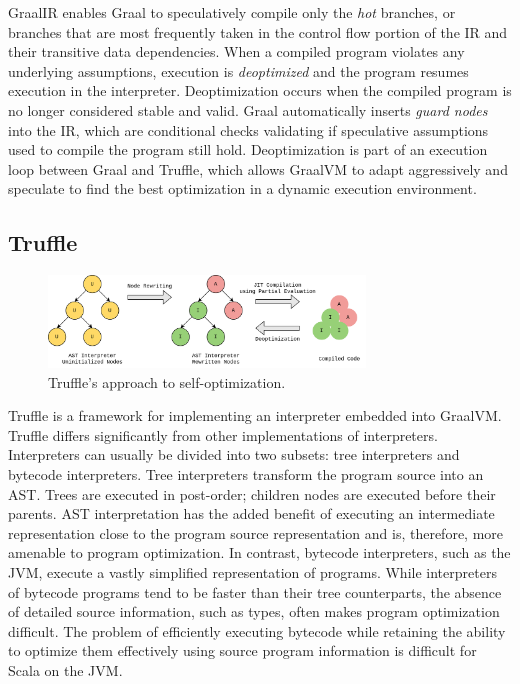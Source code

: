 GraalIR enables Graal to speculatively compile only the \textit{hot} branches\cite{graalvm:speculative-ir}, or branches that are most frequently taken in the control flow portion of the IR and their transitive data dependencies.
When a compiled program violates any underlying assumptions, execution is \textit{deoptimized}\cite{self:deoptimization} and the program resumes execution in the interpreter.
Deoptimization occurs when the compiled program is no longer considered stable and valid.
Graal automatically inserts \textit{guard nodes} into the IR, which are conditional checks validating if speculative assumptions used to compile the program still hold.
Deoptimization is part of an execution loop between Graal and Truffle, which allows GraalVM to adapt aggressively and speculate to find the best optimization in a dynamic execution environment.

\subsection{Truffle}

\begin{figure}[!htb]
	\centering
	\includegraphics[width=0.75\textwidth]{figures/truffle-loop.png}
	\caption{Truffle's approach to self-optimization\cite{truffle:thesis}.}
	\label{diagram:graal-loop}
\end{figure}

Truffle is a framework for implementing an interpreter embedded into GraalVM.
Truffle differs significantly from other implementations of interpreters.
Interpreters can usually be divided into two subsets: tree interpreters and bytecode interpreters.
Tree interpreters transform the program source into an AST. 
Trees are executed in post-order; children nodes are executed before their parents.
AST interpretation has the added benefit of executing an intermediate representation close to the program source representation and is, therefore, more amenable to program optimization.
In contrast, bytecode interpreters, such as the JVM, execute a vastly simplified representation of programs.
While interpreters of bytecode programs tend to be faster than their tree counterparts, the absence of detailed source information, such as types, often makes program optimization difficult.
The problem of efficiently executing bytecode while retaining the ability to optimize them effectively using source program information is difficult for Scala on the JVM. 

